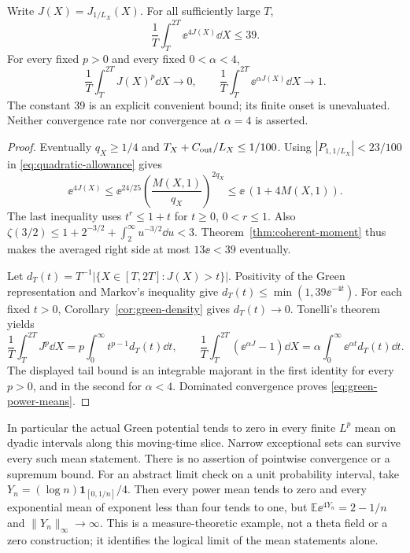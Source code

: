 \begin{theorem}
\label{thm:green-power-means}
Write \(J(X)=J_{1/L_X}(X)\). For all sufficiently large \(T\),
\begin{equation}\label{eq:green-exponential-bound}
 \frac1T\int_T^{2T}\ee^{4J(X)}\dd X\le39.
\end{equation}
For every fixed \(p>0\) and every fixed \(0<\alpha<4\),
\begin{equation}\label{eq:green-power-means}
 \frac1T\int_T^{2T}J(X)^p\dd X\longrightarrow0,
 \qquad
 \frac1T\int_T^{2T}\ee^{\alpha J(X)}\dd X\longrightarrow1.
\end{equation}
The constant 39 is an explicit convenient bound; its finite onset is
unevaluated. Neither convergence rate nor convergence at \(\alpha=4\)
is asserted.
\end{theorem}
\begin{proof}
Eventually \(q_X\ge1/4\) and
\(T_X+C_{\rm out}/L_X\le1/100\). Using
\(|P_{1,1/L_X}|<23/100\) in \eqref{eq:quadratic-allowance} gives
\[
 \ee^{4J(X)}\le\ee^{24/25}
       \left(\frac{M(X,1)}{q_X}\right)^{2q_X}
       \le\ee\,(1+4M(X,1)).
\]
The last inequality uses \(t^r\le1+t\) for \(t\ge0\),
\(0<r\le1\). Also
\(\zeta(3/2)\le1+2^{-3/2}+\int_2^\infty u^{-3/2}\dd u<3\).
Theorem~\ref{thm:coherent-moment} thus makes the averaged right side
at most \(13\ee<39\) eventually.

Let \(d_T(t)=T^{-1}|\{X\in[T,2T]:J(X)>t\}|\).
Positivity of the Green representation and Markov's inequality give
\(d_T(t)\le\min(1,39\ee^{-4t})\). For each fixed \(t>0\),
Corollary~\ref{cor:green-density} gives \(d_T(t)\to0\).
Tonelli's theorem yields
\[
 \frac1T\int_T^{2T}J^p\dd X
     =p\int_0^\infty t^{p-1}d_T(t)\dd t,
 \qquad
 \frac1T\int_T^{2T}(\ee^{\alpha J}-1)\dd X
     =\alpha\int_0^\infty\ee^{\alpha t}d_T(t)\dd t.
\]
The displayed tail bound is an integrable majorant in the first
identity for every \(p>0\), and in the second for \(\alpha<4\).
Dominated convergence proves \eqref{eq:green-power-means}.
\end{proof}

In particular the actual Green potential tends to zero in every
finite \(L^p\) mean on dyadic intervals along this moving-time slice.
Narrow exceptional sets can survive every such mean statement.
There is no assertion of pointwise convergence or a supremum bound.
For an abstract limit check on a unit probability interval, take
\(Y_n=(\log n)\mathbf1_{[0,1/n]}/4\). Then every power mean
tends to zero and every exponential mean of exponent less than four
tends to one, but \(\mathbb E\ee^{4Y_n}=2-1/n\) and
\(\|Y_n\|_\infty\to\infty\). This is a measure-theoretic
example, not a theta field or a zero construction; it identifies the
logical limit of the mean statements alone.

